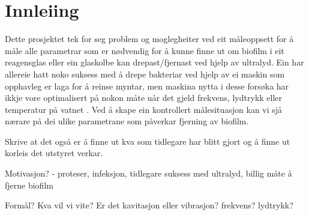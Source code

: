 \section{Innleiing}
Dette prosjektet tek for seg problem og moglegheiter ved eit måleoppsett for å måle alle parametrar som er nødvendig for å kunne finne ut om biofilm i eit reagensglas eller ein glaskolbe kan drepast/fjernast ved hjelp av ultralyd. Ein har allereie hatt noko suksess med å drepe bakteriar ved hjelp av ei maskin som opphavleg er laga for å reinse myntar, men maskina nytta i desse forsøka har ikkje vore optimalisert på nokon måte når det gjeld frekvens, lydtrykk eller temperatur på vatnet \cite{ultraprotese}. Ved å skape ein kontrollert målesituasjon kan vi sjå nærare på dei ulike parametrane som påverkar fjerning av biofilm.

Skrive at det også er å finne ut kva som tidlegare har blitt gjort og å finne ut korleis det utstyret verkar.

Motivasjon? - proteser, infeksjon, tidlegare suksess med ultralyd, billig måte å fjerne biofilm

Formål? Kva vil vi vite? Er det kavitasjon eller vibrasjon? frekvens? lydtrykk?
